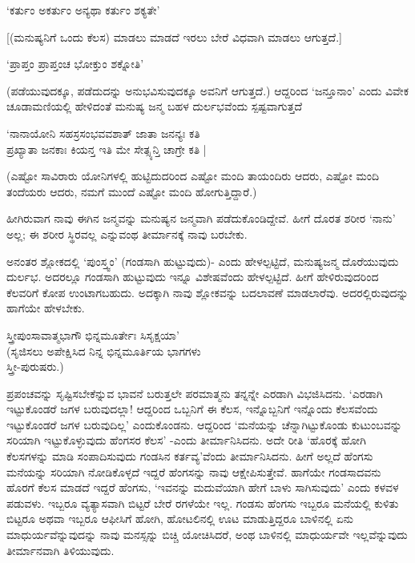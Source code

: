 \begin{shloka}
`ಕರ್ತುಂ ಅಕರ್ತುಂ ಅನ್ಯಥಾ ಕರ್ತುಂ ಶಕ್ಯತೇ'
\end{shloka}

[(ಮನುಷ್ಯನಿಗೆ ಒಂದು ಕೆಲಸ) ಮಾಡಲು ಮಾಡದೆ ಇರಲು ಬೇರೆ ವಿಧವಾಗಿ ಮಾಡಲು ಆಗುತ್ತದೆ.]

\begin{shloka}
`ಪ್ರಾಪ್ತಂ ಪ್ರಾಪ್ತಂಚ ಭೋಕ್ತುಂ ಶಕ್ನೋತಿ'
\end{shloka}

(ಪಡೆಯುವುದಕ್ಕೂ, ಪಡೆದುದನ್ನು ಅನುಭವಿಸುವುದಕ್ಕೂ ಅವನಿಗೆ ಆಗುತ್ತದೆ.) ಆದ್ದರಿಂದ `ಜನ್ತೂನಾಂ' ಎಂದು ವಿವೇಕ ಚೂಡಾಮಣಿಯಲ್ಲಿ ಹೇಳಿದಂತೆ ಮನುಷ್ಯ ಜನ್ಮ ಬಹಳ ದುರ್ಲಭವೆಂದು ಸ್ಪಷ್ಟವಾಗುತ್ತದೆ

\begin{shloka}
`ನಾನಾಯೋನಿ ಸಹಸ್ರಸಂಭವವಶಾತ್ ಜಾತಾ ಜನನ್ಯಃ ಕತಿ\\
ಪ್ರಖ್ಯಾತಾ ಜನಕಾಃ ಕಿಯನ್ತ ಇತಿ ಮೇ ಸೇತ್ಸ್ಯನ್ತಿ ಚಾಗ್ರೇ ಕತಿ |
\end{shloka}

(ಎಷ್ಟೋ ಸಾವಿರಾರು ಯೋನಿಗಳಲ್ಲಿ ಹುಟ್ಟಿದುದರಿಂದ ಎಷ್ಟೋ ಮಂದಿ ತಾಯಂದಿರು ಆದರು, ಎಷ್ಟೋ ಮಂದಿ ತಂದೆಯರು ಆದರು, ನಮಗೆ ಮುಂದೆ ಎಷ್ಟೋ ಮಂದಿ ಹೋಗುತ್ತಿದ್ದಾರೆ.)

ಹೀಗಿರುವಾಗ ನಾವು ಈಗಿನ ಜನ್ಮವನ್ನು ಮನುಷ್ಯನ ಜನ್ಮವಾಗಿ ಪಡೆದುಕೊಂಡಿದ್ದೇವೆ. ಹೀಗೆ ದೊರತ ಶರೀರ `ನಾನು' ಅಲ್ಲ; ಈ ಶರೀರ ಸ್ಥಿರವಲ್ಲ ಎನ್ನುವಂಥ ತೀರ್ಮಾನಕ್ಕೆ ನಾವು ಬರಬೇಕು.

ಅನಂತರ ಶ್ಲೋಕದಲ್ಲಿ `ಪುಂಸ್ತ್ವಂ' (ಗಂಡಸಾಗಿ ಹುಟ್ಟುವುದು)- ಎಂದು ಹೇಳಲ್ಪಟ್ಟಿದೆ, ಮನುಷ್ಯಜನ್ಮ ದೊರೆಯುವುದು ದುರ್ಲಭ. ಅದರಲ್ಲೂ ಗಂಡಸಾಗಿ ಹುಟ್ಟುವುದು ಇನ್ನೂ ವಿಶೇಷವೆಂದು ಹೇಳಲ್ಪಟ್ಟಿದೆ. ಹೀಗೆ ಹೇಳಿರುವುದರಿಂದ ಕೆಲವರಿಗೆ ಕೋಪ ಉಂಟಾಗಬಹುದು. ಅದಕ್ಕಾಗಿ ನಾವು ಶ್ಲೋಕವನ್ನು ಬದಲಾವಣೆ ಮಾಡಲಾರೆವು. ಅದರಲ್ಲಿರುವುದನ್ನು ಹಾಗೆಯೇ ಹೇಳಬೇಕು.

\begin{shloka}
ಸ್ತ್ರೀಪುಂಸಾವಾತ್ಮಭಾಗೌ ಭಿನ್ನಮೂರ್ತೇಃ ಸಿಸೃಕ್ಷಯಾ'\\
(ಸೃಜಿಸಲು ಅಪೇಕ್ಷಿಸಿದ ನಿನ್ನ ಭಿನ್ನಮೂರ್ತಿಯ ಭಾಗಗಳು\\
ಸ್ತ್ರೀ-ಪುರುಷರು.)
\end{shloka}

ಪ್ರಪಂಚವನ್ನು ಸೃಷ್ಟಿಸಬೇಕೆನ್ನುವ ಭಾವನೆ ಬರುತ್ತಲೇ ಪರಮಾತ್ಮನು ತನ್ನನ್ನೇ ಎರಡಾಗಿ ವಿಭಜಿಸಿದನು. `ಎರಡಾಗಿ ಇಟ್ಟುಕೊಂಡರೆ ಜಗಳ ಬರುವುದಲ್ಲಾ! ಆದ್ದರಿಂದ ಒಬ್ಬನಿಗೆ ಈ ಕೆಲಸ, ಇನ್ನೊಬ್ಬನಿಗೆ ಇನ್ನೊಂದು ಕೆಲಸವೆಂದು ಇಟ್ಟುಕೊಂಡರೆ ಜಗಳ ಬರುವುದಿಲ್ಲ' ಎಂದುಕೊಂಡನು. ಆದ್ದರಿಂದ `ಮನೆಯನ್ನು ಚೆನ್ನಾಗಿಟ್ಟುಕೊಂಡು ಕುಟುಂಬವನ್ನು ಸರಿಯಾಗಿ ಇಟ್ಟುಕೊಳ್ಳುವುದು ಹೆಂಗಸರ ಕೆಲಸ' -ಎಂದು ತೀರ್ಮಾನಿಸಿದನು. ಅದೇ ರೀತಿ `ಹೊರಕ್ಕೆ ಹೋಗಿ ಕೆಲಸಗಳನ್ನು ಮಾಡಿ ಸಂಪಾದಿಸುವುದು ಗಂಡಸಿನ ಕರ್ತವ್ಯ'ವೆಂದು ತೀರ್ಮಾನಿಸಿದನು. ಹೀಗೆ ಅಲ್ಲದೆ ಹೆಂಗಸು ಮನೆಯನ್ನು ಸರಿಯಾಗಿ ನೋಡಿಕೊಳ್ಳದೆ ಇದ್ದರೆ ಹೆಂಗಸನ್ನು ನಾವು ಆಕ್ಷೇಪಿಸುತ್ತೇವೆ. ಹಾಗೆಯೇ ಗಂಡಸಾದವನು ಹೊರಗೆ ಕೆಲಸ ಮಾಡದೆ ಇದ್ದರೆ ಹೆಂಗಸು, `ಇವನನ್ನು ಮದುವೆಯಾಗಿ ಹೇಗೆ ಬಾಳು ಸಾಗಿಸುವುದು' ಎಂದು ಕಳವಳ ಪಡುವಳು. ಇಬ್ಬರೂ ವ್ಯತ್ಯಾಸವಾಗಿ ಬಿಟ್ಟರೆ ಬೇರೆ ರಗಳೆಯೇ ಇಲ್ಲ. ಗಂಡಸು ಹೆಂಗಸು ಇಬ್ಬರೂ ಮನೆಯಲ್ಲಿ ಕುಳಿತು ಬಿಟ್ಟರೂ ಅಥವಾ ಇಬ್ಬರೂ ಆಫೀಸಿಗೆ ಹೋಗಿ, ಹೋಟಲಿನಲ್ಲಿ ಊಟ ಮಾಡುತ್ತಿದ್ದರೂ ಬಾಳಿನಲ್ಲಿ ಏನು ಮಾಧುರ್ಯವೆನ್ನುವುದನ್ನು ನಾವು ಮನಸ್ಸನ್ನು ಬಿಚ್ಚಿ ಯೋಚಿಸಿದರೆ, ಅಂಥ ಬಾಳಿನಲ್ಲಿ ಮಾಧುರ್ಯವೇ ಇಲ್ಲವೆನ್ನುವುದು ತೀರ್ಮಾನವಾಗಿ ತಿಳಿಯುವುದು.

